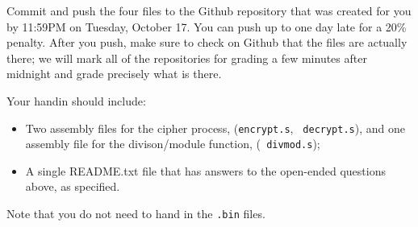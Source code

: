 \documentclass{article}
\begin{document}
Commit and push the four files to the Github repository that was created
for you by 11:59PM on Tuesday, October 17. You can push up to one day late for
a 20\% penalty. After you push, make sure to check on Github that the files are
actually there; we will mark all of the repositories for grading a few minutes
after midnight and grade precisely what is there.

Your handin should include:

\begin{itemize}
\item Two assembly files for the cipher process, ({\tt encrypt.s}, {\tt 
decrypt.s}), and one assembly file for the divison/module function, ({\tt 
divmod.s}); 
\item A single README.txt file that has answers to the open-ended questions
above, as specified.
\end{itemize}

Note that you do not need to hand in the {\tt .bin} files.
\end{document}
